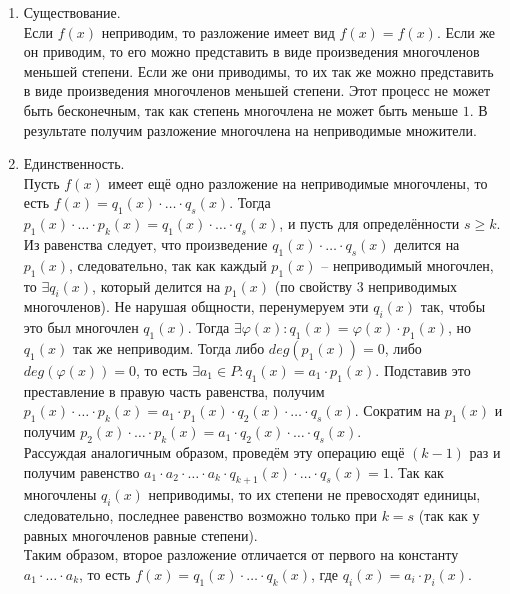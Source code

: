 \begin{Proof}
	\begin{enumerate}
		\item Существование.\\
		 Если $f(x)$ неприводим, то разложение имеет вид $f(x) = f(x)$. Если же он приводим, то 
		его можно представить в виде произведения многочленов меньшей степени. Если же они приводимы, то их так же можно представить в виде произведения многочленов меньшей степени. Этот процесс не может быть бесконечным, так как степень многочлена не может быть меньше $1$. В результате 
		получим разложение многочлена на неприводимые множители.
		\item Единственность.\\
		Пусть $f(x)$ имеет ещё одно разложение на неприводимые многочлены, то есть $f(x) = 
		q_1(x)\cdot \ldots \cdot q_s(x)$. Тогда $p_1(x)\cdot \ldots \cdot p_k(x) = q_1(x)\cdot \ldots \cdot q_s(x)$, и пусть для определённости $s \geqslant k$.\\ 
		Из равенства следует, что произведение $q_1(x)\cdot \ldots \cdot q_s(x)$ делится на $p_1(x)$, следовательно, так как каждый $p_1(x)$ – 
		неприводимый многочлен, то $\exists q_i(x)$, который делится на $p_1(x)$ (по свойству 3 неприводимых многочленов). Не нарушая общности, 
		перенумеруем эти $q_i(x)$ так, чтобы это был многочлен $q_1(x)$. Тогда $\exists \varphi(x): q_1(x) = \varphi(x)\cdot p_1(x)$, но $q_1(x)$ так же 
		неприводим. Тогда либо $deg(p_1(x)) = 0$, либо $deg(\varphi(x)) = 0$, то есть $\exists a_1 \in  P:  q_1(x) = a_1\cdot p_1(x)$. Подставив это 
		преставление в правую часть равенства, получим $p_1(x)\cdot \ldots \cdot p_k(x) = a_1\cdot p_1(x)\cdot q_2(x)\cdot \ldots \cdot q_s(x)$. Сократим 
		на $p_1(x)$ и получим $p_2(x)\cdot \ldots \cdot p_k(x) = a_1\cdot q_2(x)\cdot \ldots \cdot q_s(x)$.\\ 
		Рассуждая аналогичным образом, проведём эту операцию ещё $(k-1)$ раз и получим 
		равенство $a_1\cdot a_2\cdot \ldots \cdot a_k\cdot q_{k+1}(x)\cdot \ldots \cdot q_s(x) = 1$. Так как многочлены $q_i(x)$ неприводимы, то их степени не превосходят единицы, следовательно, последнее равенство возможно только при $k = s$ (так как у равных многочленов равные степени).\\ 
		Таким образом, второе разложение отличается от первого на константу $a_1\cdot \ldots \cdot a_k$, то есть $f(x) = q_1(x)\cdot \ldots \cdot q_k(x)$, где $q_i(x) = a_i\cdot p_i(x)$. 
	\end{enumerate}
\end{Proof}
